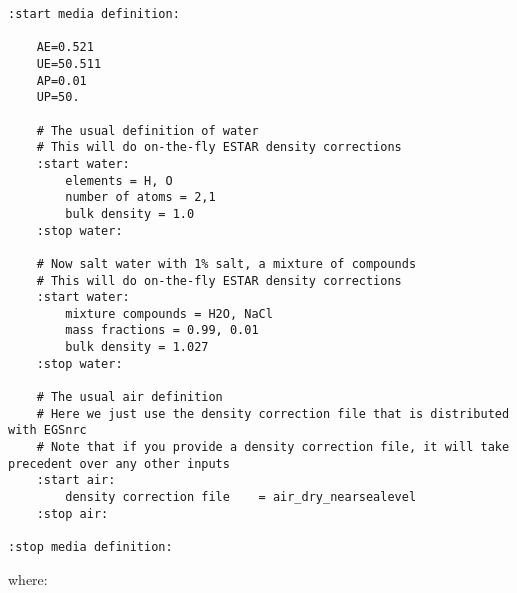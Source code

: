 \begin{verbatim}
:start media definition:

    AE=0.521
    UE=50.511
    AP=0.01
    UP=50.

    # The usual definition of water
    # This will do on-the-fly ESTAR density corrections
    :start water:
        elements = H, O
        number of atoms = 2,1
        bulk density = 1.0
    :stop water:

    # Now salt water with 1% salt, a mixture of compounds
    # This will do on-the-fly ESTAR density corrections
    :start water:
        mixture compounds = H2O, NaCl
        mass fractions = 0.99, 0.01
        bulk density = 1.027
    :stop water:

    # The usual air definition
    # Here we just use the density correction file that is distributed with EGSnrc
    # Note that if you provide a density correction file, it will take precedent over any other inputs
    :start air:
        density correction file    = air_dry_nearsealevel
    :stop air:

:stop media definition:
\end{verbatim}
where:
